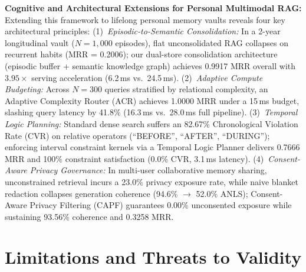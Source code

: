 \textbf{Cognitive and Architectural Extensions for Personal Multimodal RAG:} Extending this framework to lifelong personal memory vaults reveals four key architectural principles: (1)~\emph{Episodic-to-Semantic Consolidation:} In a 2-year longitudinal vault ($N=1{,}000$ episodes), flat unconsolidated RAG collapses on recurrent habits (MRR = 0.2006); our dual-store consolidation architecture (episodic buffer + semantic knowledge graph) achieves 0.9917 MRR overall with $3.95\times$ serving acceleration (6.2\,ms vs.\ 24.5\,ms). (2)~\emph{Adaptive Compute Budgeting:} Across $N=300$ queries stratified by relational complexity, an Adaptive Complexity Router (ACR) achieves 1.0000 MRR under a 15\,ms budget, slashing query latency by 41.8\% (16.3\,ms vs.\ 28.0\,ms full pipeline). (3)~\emph{Temporal Logic Planning:} Standard dense search suffers an 82.67\% Chronological Violation Rate (CVR) on relative operators (``BEFORE'', ``AFTER'', ``DURING''); enforcing interval constraint kernels via a Temporal Logic Planner delivers 0.7666 MRR and 100\% constraint satisfaction (0.0\% CVR, 3.1\,ms latency). (4)~\emph{Consent-Aware Privacy Governance:} In multi-user collaborative memory sharing, unconstrained retrieval incurs a 23.0\% privacy exposure rate, while naive blanket redaction collapses generation coherence (94.6\% $\to$ 52.0\% ANLS); Consent-Aware Privacy Filtering (CAPF) guarantees 0.00\% unconsented exposure while sustaining 93.56\% coherence and 0.3258 MRR.

\section{Limitations and Threats to Validity}
\label{sec:limitations}

